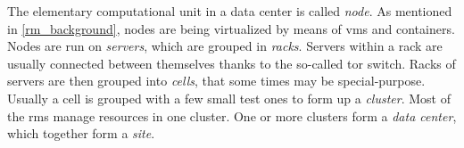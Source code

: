 
The elementary computational unit in a data center is called \textit{node}.
As mentioned in \autoref{rm_background}, nodes are being virtualized by means of \glspl{vm} and containers.
Nodes are run on \textit{servers}, which are grouped in \textit{racks}.
Servers within a rack are usually connected between themselves thanks to the so-called \gls{tor} switch.
Racks of servers are then grouped into \textit{cells}, that some times may be special-purpose.
Usually a cell is grouped with a few small test ones to form up a \textit{cluster}.
Most of the \glspl{rm} manage resources in one cluster.
One or more clusters form a \textit{data center}, which together form a \textit{site}.